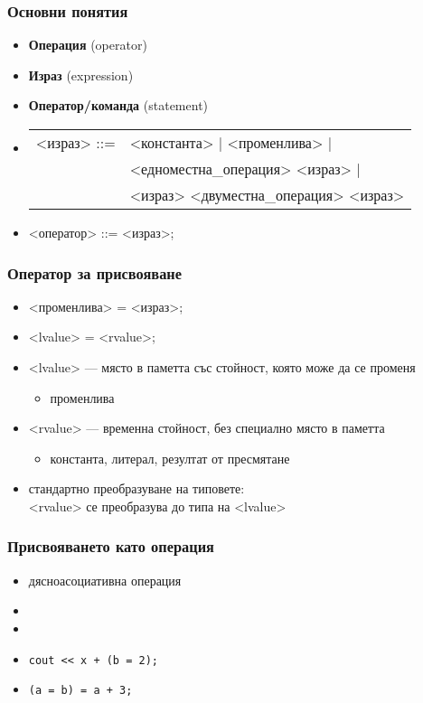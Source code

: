 \documentclass{beamer}
\begin{document}
\begin{frame}
  \frametitle{Основни понятия}

  \begin{itemize}
  \item \textbf{Операция} (operator)
  \item \textbf{Израз} (expression)
  \item \textbf{Оператор/команда} (statement)
  \item{}
    \begin{tabular}[t]{@{}rl@{}}
      <израз> ::= &<константа> | <променлива> |\\
      &<едноместна\_операция> <израз> |\\
      &<израз> <двуместна\_операция> <израз>
    \end{tabular}
  \item{} <оператор> ::= <израз>\tta;
  \end{itemize}
\end{frame}

\begin{frame}
  \frametitle{Оператор за присвояване}

  \begin{itemize}[<+->]
  \item{} <променлива> \tta= <израз>\tta;
  \item{} <lvalue> \tta= <rvalue>\tta;
  \item{} <lvalue> --- място в паметта със стойност, която може да се променя
    \begin{itemize}[<.->]
    \item  \exa променлива
  \end{itemize}
  \item{} <rvalue> --- временна стойност, без специално място в паметта
    \begin{itemize}[<.->]
    \item \exa константа, литерал, резултат от пресмятане
  \end{itemize}
  \item стандартно преобразуване на типовете:\\
    <rvalue> се преобразува до типа на <lvalue>
  \end{itemize}

\end{frame}

\begin{frame}
  \frametitle{Присвояването като операция}
  \begin{itemize}
  \item<1-> \alert{дясноасоциативна} операция
  \item<2-> 
  \item<3> 
  \item<5-> \exa \lstinline{cout << x + (b = 2);}
  \item<6-> \exa \lstinline{(a = b) = a + 3;}
  \end{itemize}
\end{frame}
\end{document}
